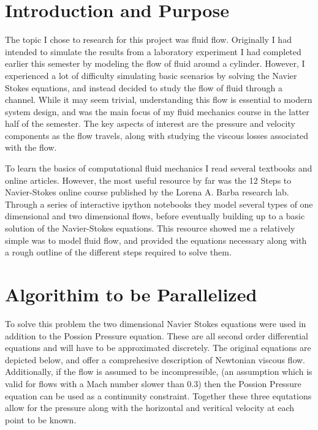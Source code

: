 \documentclass[12pt]{article}
\begin{document}
\maketitle

\section{Introduction and Purpose}
The topic I chose to research for this project was fluid flow. Originally I had intended to simulate the results
from a laboratory experiment I had completed earlier this semester by modeling the flow of fluid around a cylinder. 
However, I experienced a lot of difficulty simulating basic scenarios by solving the Navier Stokes equations, and 
instead decided to study the flow of fluid through a channel. While it may seem trivial, understanding this flow is 
essential to modern system design, and was the main focus of my fluid mechanics course in the latter half of the 
semester. The key aspects of interest are the pressure and velocity components as the flow travels, along with 
studying the viscous losses associated with the flow. 

To learn the basics of computational fluid mechanics I read several textbooks and online articles. However, the most 
useful resource by far was the 12 Steps to Navier-Stokes online course published by the Lorena A. Barba research lab. 
Through a series of interactive ipython notebooks they model several types of one dimensional and two dimensional 
flows, before eventually building up to a basic solution of the Navier-Stokes equations. This resource showed me a 
relatively simple was to model fluid flow, and provided the equations necessary along with a rough outline of the 
different steps required to solve them.

\section{Algorithim to be Parallelized}
To solve this problem the two dimensional Navier Stokes equations were used in addition to the Possion Pressure 
equation. These are all second order differential equations and will have to be approximated discretely. The original 
equations are depicted below, and offer a comprehesive description of Newtonian viscous flow. Additionally, if the 
flow is assumed to be incompressible, (an assumption which is valid for flows with a Mach number slower than 0.3) then 
the Possion Pressure equation can be used as a continunity constraint. Together these three equtations allow for the 
pressure along with the  horizontal and veritical velocity at each point to be known.
\end{document}
